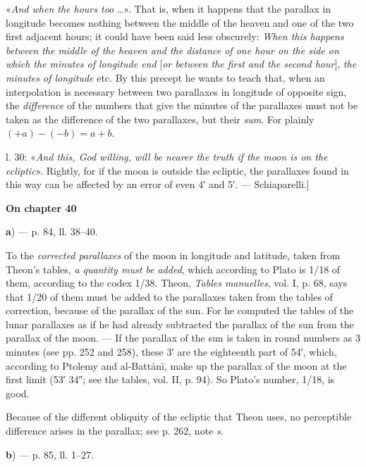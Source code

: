 \documentclass[11pt]{article}
\newcommand{\Pg}[1]{\marginpar{\footnotesize\color{gray}#1}}
\newcommand{\UnitHead}[2]{\par\setcounter{footnoteT}{0}\needspace{8\baselineskip}\bigskip\pdfbookmark[1]{#1}{unit-#2}\hypertarget{EN-#2}{}%
 {\large\bfseries\interlinepenalty=10000 #1\par}\nobreak\medskip}
\begin{document}
\par «\emph{And when the hours too} …». That is, when it happens that the parallax in longitude becomes nothing between the middle of the heaven and one of the two first adjacent hours; it could have been said less obscurely: \emph{When this happens between the middle of the heaven and the distance of one hour on the side on which the minutes of longitude end} [\emph{or between the first and the second hour}], \emph{the minutes of longitude} etc. By this precept he wants to teach that, when an interpolation is necessary between two parallaxes in longitude of opposite sign, the \emph{difference} of the numbers that give the minutes of the parallaxes must not be taken as the difference of the two parallaxes, but their \emph{sum}. For plainly $(+a) - (-b) = a + b$.\par
\par l. 30: «\emph{And this, God willing, will be nearer the truth if the moon is on the ecliptic}». Rightly, for if the moon is outside the ecliptic, the parallaxes found in this way can be affected by an error of even 4′ and 5′. — Schiaparelli.]\par
\UnitHead{On chapter 40}{A40}\Pg{I 264}
\par\begin{center}\textbf{a}) — p. 84, ll. 38–40.\end{center}
\par To the \emph{corrected parallaxes} of the moon in longitude and latitude, taken from Theon's tables, \emph{a quantity must be added}, which according to Plato is 1/18 of them, according to the codex 1/38. Theon, \emph{Tables manuelles}, vol. I, p. 68, says that 1/20 of them must be added to the parallaxes taken from the tables of correction, because of the parallax of the sun. For he computed the tables of the lunar parallaxes as if he had already subtracted the parallax of the sun from the parallax of the moon. — If the parallax of the sun is taken in round numbers as 3 minutes (see pp. 252 and 258), these 3′ are the eighteenth part of 54′, which, according to Ptolemy and al-Battānī, make up the parallax of the moon at the first limit (53′ 34″; see the tables, vol. II, p. 94). So Plato's number, 1/18, is good.\par
\par Because of the different obliquity of the ecliptic that Theon uses, no perceptible difference arises in the parallax; see p. 262, note \emph{s}.\par
\par\begin{center}\textbf{b}) — p. 85, ll. 1–27.\end{center}
\end{document}
